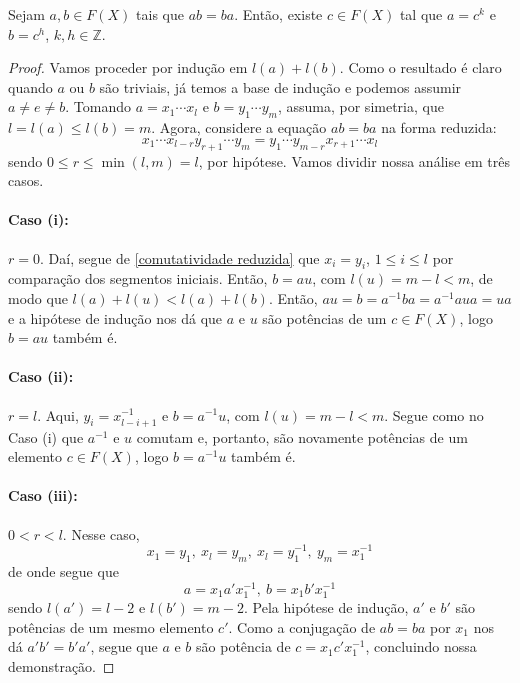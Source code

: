     	\begin{lemma}
    	\label{comutatividade em grupos livres}
    		Sejam $a,b\in F(X)$ tais que $ab=ba$. Então, existe $c\in F(X)$ tal que $a = c^k$ e 
    		$b = c^h$, $k, h\in\mathbb{Z}$.
    	\end{lemma}
    	\begin{proof}
    		Vamos proceder por indução em $l(a) + l(b)$. Como o resultado é claro quando $a$ ou $b$ 
    		são triviais, já temos a base de indução e podemos assumir $a\neq e\neq b$. Tomando 
    		$a = x_1\cdots x_l$ e $b = y_1\cdots y_m$, assuma, por simetria, que $l = l(a) \leq l(b) = m$. 
    		Agora, considere a equação $ab=ba$ na forma reduzida:
    		\begin{equation}
    		\label{comutatividade reduzida}
    		    x_1\cdots x_{l-r}y_{r+1}\cdots y_m = y_1\cdots y_{m-r}x_{r+1}\cdots x_l
    		\end{equation}
    		sendo $0\leq r\leq\min(l,m) = l$, por hipótese. Vamos dividir nossa análise 
    		em três casos.
    		
    		\paragraph{Caso (i):} $r=0$. Daí, segue de \eqref{comutatividade reduzida} que 
    		$x_i=y_i$, $1\leq i\leq l$ por comparação dos segmentos iniciais. Então, $b = au$, com 
    		$l(u) = m-l<m$, de modo que $l(a) + l(u)< l(a) + l(b)$. Então, $au = b = a^{-1}ba = a^{-1}aua = ua$ 
    		e a hipótese de indução nos dá que $a$ e $u$ são potências de um $c\in F(X)$, logo $b=au$ também é.
    		
    		\paragraph{Caso (ii):} $r = l$. Aqui, $y_i = x_{l-i+1}^{-1}$ e $b = a^{-1}u$, com $l(u) = m-l<m$.
    		Segue como no Caso (i) que $a^{-1}$ e $u$ comutam e, portanto, são novamente potências de um 
    		elemento $c\in F(X)$, logo $b = a^{-1}u$ também é.
    		
    		\paragraph{Caso (iii):} $0 < r < l$. Nesse caso, 
    		\begin{equation*}
    		    x_1 = y_1, \ x_l = y_m, \ x_l = y_1^{-1}, \ y_m = x_1^{-1}
    		\end{equation*}
    		de onde segue que
    		\begin{equation*}
    		    a = x_1a'x_1^{-1}, \ b = x_1b'x_1^{-1}
    		\end{equation*}
    		sendo $l(a') = l-2$ e $l(b') = m-2$. Pela hipótese de indução, $a'$ e $b'$ 
    		são potências de um mesmo elemento $c'$. Como a conjugação de $ab=ba$ por $x_1$ nos dá $a'b' = b'a'$,
    		segue que $a$ e $b$ são potência de $c = x_1c'x_1^{-1}$, concluindo nossa demonstração. 
    	\end{proof}
